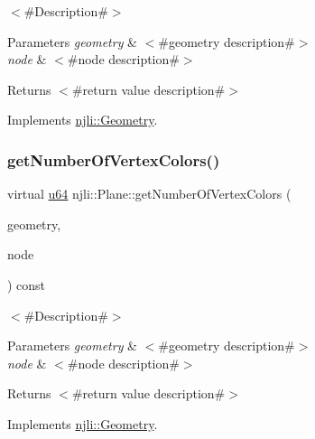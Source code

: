 $<$\#\+Description\#$>$


\begin{DoxyParams}{Parameters}
{\em geometry} & $<$\#geometry description\#$>$ \\
\hline
{\em node} & $<$\#node description\#$>$\\
\hline
\end{DoxyParams}
\begin{DoxyReturn}{Returns}
$<$\#return value description\#$>$ 
\end{DoxyReturn}


Implements \mbox{\hyperlink{classnjli_1_1_geometry_a495713b5eea24429df8899cfaa59c832}{njli\+::\+Geometry}}.

\mbox{\label{classnjli_1_1_plane_ad003f2734ae681dc704bac77d7e7ca89}} 
\subsubsection{\texorpdfstring{get\+Number\+Of\+Vertex\+Colors()}{getNumberOfVertexColors()}}
{\footnotesize\ttfamily virtual \mbox{\hyperlink{_util_8h_ad758b7a5c3f18ed79d2fcd23d9f16357}{u64}} njli\+::\+Plane\+::get\+Number\+Of\+Vertex\+Colors (\begin{DoxyParamCaption}\item[{\mbox{\hyperlink{classnjli_1_1_level_of_detail}{Level\+Of\+Detail}} $\ast$}]{geometry,  }\item[{\mbox{\hyperlink{classnjli_1_1_node}{Node}} $\ast$}]{node }\end{DoxyParamCaption}) const\hspace{0.3cm}{\ttfamily [virtual]}}

$<$\#\+Description\#$>$


\begin{DoxyParams}{Parameters}
{\em geometry} & $<$\#geometry description\#$>$ \\
\hline
{\em node} & $<$\#node description\#$>$\\
\hline
\end{DoxyParams}
\begin{DoxyReturn}{Returns}
$<$\#return value description\#$>$ 
\end{DoxyReturn}


Implements \mbox{\hyperlink{classnjli_1_1_geometry_a224b18abc15b88b556e6b71bb89ecf73}{njli\+::\+Geometry}}.

